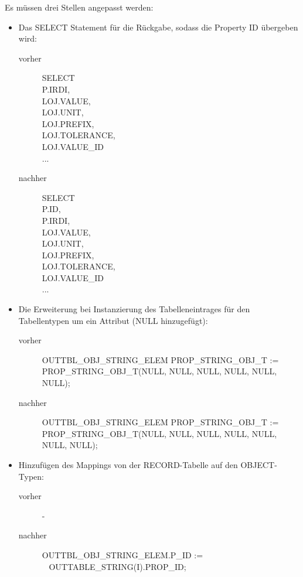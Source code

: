 Es müssen drei Stellen angepasst werden: 

\begin{itemize}
\item Das SELECT Statement für die Rückgabe, sodass die Property ID übergeben wird: 
  \begin{description}
  \item[vorher] SELECT \\
  P.IRDI, \\
  LOJ.VALUE, \\ 
  LOJ.UNIT, \\
  LOJ.PREFIX, \\ 
  LOJ.TOLERANCE, \\
  LOJ.VALUE\_ID \\
  ...
  \item[nachher] SELECT \\
  P.ID, \\
  P.IRDI, \\ 
  LOJ.VALUE, \\ 
  LOJ.UNIT, \\
  LOJ.PREFIX, \\ 
  LOJ.TOLERANCE, \\ 
  LOJ.VALUE\_ID \\
  ...
  \end{description}
\item Die Erweiterung bei Instanzierung des Tabelleneintrages für den Tabellentypen um ein Attribut (NULL hinzugefügt): 
  \begin{description}
  \item[vorher] OUTTBL\_OBJ\_STRING\_ELEM  PROP\_STRING\_OBJ\_T :=  \\
  PROP\_STRING\_OBJ\_T(NULL, NULL, NULL, NULL, NULL, NULL);
  \item[nachher] OUTTBL\_OBJ\_STRING\_ELEM  PROP\_STRING\_OBJ\_T :=  \\
  PROP\_STRING\_OBJ\_T(NULL, NULL, NULL, NULL, NULL, NULL, NULL);
  \end{description}
\item Hinzufügen des Mappings von der RECORD-Tabelle auf den OBJECT-Typen:
  \begin{description}
  \item[vorher] -
  \item[nachher] OUTTBL\_OBJ\_STRING\_ELEM.P\_ID := \\~ 
  OUTTABLE\_STRING(I).PROP\_ID;  
  \end{description}
\end{itemize}
 
